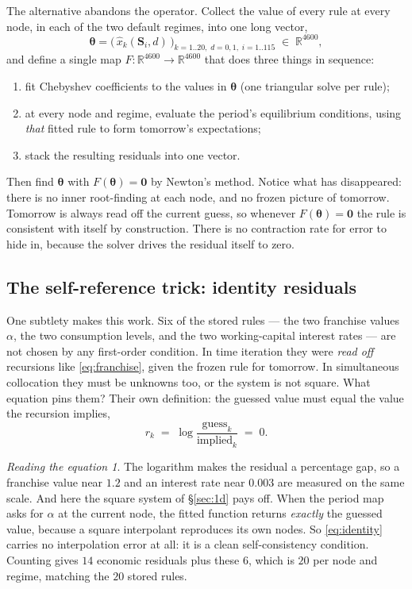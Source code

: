 \documentclass[10pt,a4paper]{article}
\theoremstyle{plain}
\theoremstyle{remark}
\newtheorem*{reading}{Reading the equation}
\newcommand{\R}{\mathbb{R}}
\newcommand{\st}{\mathbf{S}}
\newcommand{\pol}{\bm{\theta}}
\begin{document}
The alternative abandons the operator. Collect the value of every rule at every node, in each
of the two default regimes, into one long vector,
\begin{equation}
  \pol = \Big(\,\hat x_k(\st_i,d)\,\Big)_{k=1..20,\;d=0,1,\;i=1..115}\;\in\;\R^{4600},
\end{equation}
and define a single map $F:\R^{4600}\to\R^{4600}$ that does three things in sequence:
\begin{enumerate}
\item fit Chebyshev coefficients to the values in $\pol$ (one triangular solve per rule);
\item at every node and regime, evaluate the period's equilibrium conditions, using
\emph{that} fitted rule to form tomorrow's expectations;
\item stack the resulting residuals into one vector.
\end{enumerate}
Then find $\pol$ with $F(\pol)=\bm 0$ by Newton's method. Notice what has disappeared: there is
no inner root-finding at each node, and no frozen picture of tomorrow. Tomorrow is always read
off the current guess, so whenever $F(\pol)=\bm0$ the rule is consistent with itself by
construction. There is no contraction rate for error to hide in, because the solver drives
the residual itself to zero.

\subsection{The self-reference trick: identity residuals}

One subtlety makes this work. Six of the stored rules --- the two franchise values $\alpha$,
the two consumption levels, and the two working-capital interest rates --- are not chosen by
any first-order condition. In time iteration they were \emph{read off} recursions like
\eqref{eq:franchise}, given the frozen rule for tomorrow. In simultaneous collocation they
must be unknowns too, or the system is not square. What equation pins them? Their own
definition: the guessed value must equal the value the recursion implies,
\begin{equation}
  r_k \;=\; \log\frac{\text{guess}_k}{\text{implied}_k} \;=\; 0 .
  \label{eq:identity}
\end{equation}

\begin{reading}
The logarithm makes the residual a percentage gap, so a franchise value near $1.2$ and an
interest rate near $0.003$ are measured on the same scale. And here the square system of
\S\ref{sec:1d} pays off. When the period map asks for $\alpha$ at the current node, the fitted
function returns \emph{exactly} the guessed value, because a square interpolant reproduces its
own nodes. So \eqref{eq:identity} carries no interpolation error at all: it is a clean
self-consistency condition. Counting gives $14$ economic residuals plus these $6$, which is
$20$ per node and regime, matching the $20$ stored rules.
\end{reading}
\end{document}
